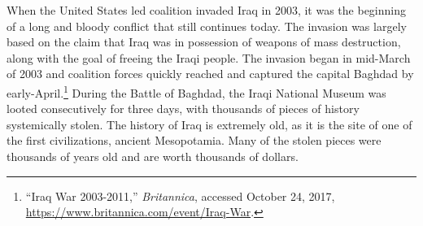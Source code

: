 \documentclass[11pt]{article}
\begin{document}
\doublespacing
When the United States led coalition invaded Iraq in 2003, it was the beginning of a long and bloody conflict that still continues today. The invasion was largely based on the claim that Iraq was in possession of weapons of mass destruction, along with the goal of freeing the Iraqi people. The invasion began in mid-March of 2003 and coalition forces quickly reached and captured the capital Baghdad by early-April.\footnote{``Iraq War 2003-2011,'' \textit{Britannica}, accessed October 24, 2017, \url{https://www.britannica.com/event/Iraq-War}.} During the Battle of Baghdad, the Iraqi National Museum was looted consecutively for three days, with thousands of pieces of history systemically stolen. The history of Iraq is extremely old, as it is the site of one of the first civilizations, ancient Mesopotamia. Many of the stolen pieces were thousands of years old and are worth thousands of dollars. 
\end{document}
